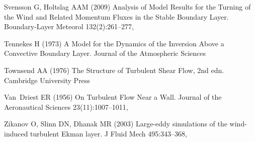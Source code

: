 \documentclass[smallcondensed,final]{svjour3}
\begin{document}
\begin{thebibliography}{57}
Svensson G, Holtslag AAM (2009) Analysis of {{Model Results}} for the
  {{Turning}} of the {{Wind}} and {{Related Momentum Fluxes}} in the {{Stable
  Boundary Layer}}. Boundary-Layer Meteorol 132(2):261--277, 

Tennekes H (1973) A {{Model}} for the {{Dynamics}} of the {{Inversion Above}} a
  {{Convective Boundary Layer}}. Journal of the Atmospheric Sciences

Townsend AA (1976) The Structure of Turbulent Shear Flow, 2nd edn. Cambridge
  University Press

Van~Driest ER (1956) On {{Turbulent Flow Near}} a {{Wall}}. Journal of the
  Aeronautical Sciences 23(11):1007--1011, 

Zikanov O, Slinn DN, Dhanak MR (2003) Large-eddy simulations of the
  wind-induced turbulent {{Ekman}} layer. J Fluid Mech 495:343--368,

\end{thebibliography}
\end{document}
